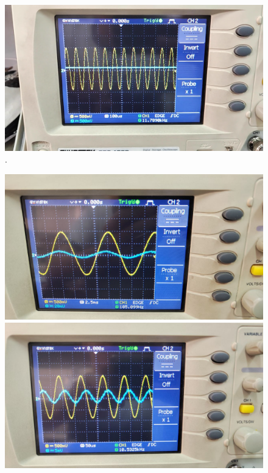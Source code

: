 \documentclass[11pt]{article}
\begin{document}
\begin{question}
\begin{subquestion}
{\begin{figure}[H]
                \includegraphics[scale=0.1,angle=0]{Fig/18.png}
                \caption{.}
            \end{figure}
            \begin{figure}[H]
                \centering
                \includegraphics[scale=0.1,angle=0]{Fig/19.jpeg}
                \includegraphics[scale=0.1,angle=0]{Fig/20.jpeg}

\end{figure}}
\end{subquestion}
\end{question}
\end{document}
